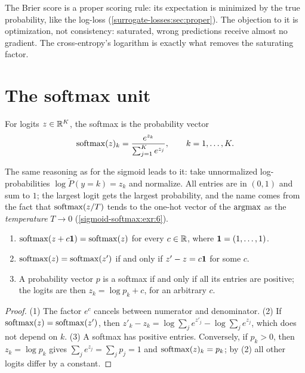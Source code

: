 \begin{notechapter}
\begin{pitfall}
The Brier score is a proper scoring rule: its expectation is minimized by the true
probability, like the log-loss (\cref{surrogate-losses:sec:proper}). The objection to it is
optimization, not consistency: saturated, wrong predictions receive almost no
gradient. The cross-entropy's logarithm is exactly what removes the saturating
factor.
\end{pitfall}

\section{The softmax unit}\label{sigmoid-softmax:sec:softmax}

\begin{definition}[Softmax]
For logits $z\in\mathbb{R}^K$, the softmax is the probability vector
\[
  \operatorname{softmax}(z)_k = \frac{e^{z_k}}{\sum_{j=1}^Ke^{z_j}},\qquad k = 1,\dots,K .
\]
\end{definition}

The same reasoning as for the sigmoid leads to it: take unnormalized
log-probabilities $\log\tilde P(y = k) = z_k$ and normalize. All entries are in $(0,1)$
and sum to $1$; the largest logit gets the largest probability, and the name
comes from the fact that $\operatorname{softmax}(z/T)$ tends to the one-hot vector of the
$\operatorname*{argmax}$ as the \emph{temperature} $T\to0$ (\cref{sigmoid-softmax:exr:6}).

\begin{proposition}\label{sigmoid-softmax:prop:shift}
\begin{enumerate}[nosep]
  \item $\operatorname{softmax}(z + c\mathbf{1}) = \operatorname{softmax}(z)$ for every $c\in\mathbb{R}$, where $\mathbf{1} = (1,\dots,1)$.
  \item $\operatorname{softmax}(z) = \operatorname{softmax}(z')$ if and only if $z' - z = c\mathbf{1}$ for some $c$.
  \item A probability vector $p$ is a softmax if and only if all its entries are
        positive; the logits are then $z_k = \log p_k + c$, for an arbitrary $c$.
\end{enumerate}
\end{proposition}

\begin{proof}
(1) The factor $e^c$ cancels between numerator and denominator. (2) If
$\operatorname{softmax}(z) = \operatorname{softmax}(z')$, then $z'_k - z_k = \log\sum_je^{z'_j} - \log\sum_je^{z_j}$, which does not depend on $k$.
(3) A softmax has positive entries. Conversely, if $p_k>0$, then $z_k = \log p_k$ gives
$\sum_je^{z_j} = \sum_jp_j = 1$ and $\operatorname{softmax}(z)_k = p_k$; by (2) all other logits differ by a constant.
\end{proof}


\end{notechapter}
